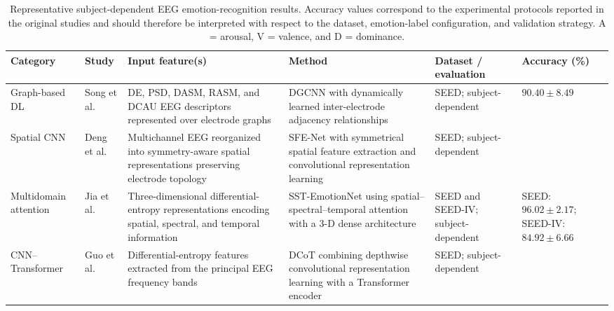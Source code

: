 \documentclass{WileyMSP-template}
\begin{document}
\begin{table}
\centering

\caption{Representative subject-dependent EEG emotion-recognition results. 
Accuracy values correspond to the experimental protocols reported in the original studies and should therefore be interpreted with respect to the dataset, emotion-label configuration, and validation strategy. 
A = arousal, V = valence, and D = dominance.}

\label{tab:subject_dependent_results}

\scriptsize
\setlength{\tabcolsep}{3.0pt}
\renewcommand{\arraystretch}{1.18}

\begin{tabularx}{\textheight}{
>{\raggedright\arraybackslash}p{2.55cm}
>{\raggedright\arraybackslash}p{3.15cm}
>{\raggedright\arraybackslash}X
>{\raggedright\arraybackslash}X
>{\raggedright\arraybackslash}p{3.65cm}
>{\raggedright\arraybackslash}p{5.15cm}}

\toprule

\textbf{Category} &
\textbf{Study} &
\textbf{Input feature(s)} &
\textbf{Method} &
\textbf{Dataset / evaluation} &
\textbf{Accuracy (\%)} \\

\midrule

Graph-based DL &
Song et al. \cite{song2020dgcnn} &
DE, PSD, DASM, RASM, and DCAU EEG descriptors represented over electrode graphs &
DGCNN with dynamically learned inter-electrode adjacency relationships &
SEED; subject-dependent &
$90.40 \pm 8.49$ \\

Spatial CNN &
Deng et al. \cite{deng2021sfenet} &
Multichannel EEG reorganized into symmetry-aware spatial representations preserving electrode topology &
SFE-Net with symmetrical spatial feature extraction and convolutional representation learning &
SEED; subject-dependent &
99.19 \\

Multidomain attention &
Jia et al. \cite{jia2020sstemotionnet} &
Three-dimensional differential-entropy representations encoding spatial, spectral, and temporal information &
SST-EmotionNet using spatial--spectral--temporal attention with a 3-D dense architecture &
SEED and SEED-IV; subject-dependent &
SEED: $96.02 \pm 2.17$; SEED-IV: $84.92 \pm 6.66$ \\

CNN--Transformer &
Guo et al. \cite{guo2022dcot} &
Differential-entropy features extracted from the principal EEG frequency bands &
DCoT combining depthwise convolutional representation learning with a Transformer encoder &
SEED; subject-dependent &
93.83 \\


\end{tabularx}
\end{table}
\end{document}
